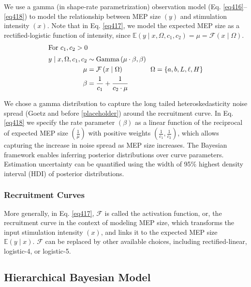 \documentclass[sn-mathphys-ay]{sn-jnl}%
\theoremstyle{thmstyleone}%
\theoremstyle{thmstyletwo}%
\theoremstyle{thmstylethree}%
\begin{document}
We use a gamma (in shape-rate parametrization) observation model (Eq. \ref{eq416}--\ref{eq418}) to model the relationship between MEP size $\left(y\right)$ and stimulation intensity $\left(x\right)$. Note that in Eq. \ref{eq417}, we model the expected MEP size as a rectified-logistic function of intensity, since $\mathbb{E}\left(y \mid x, \Omega, c_1, c_2\right) = \mu = \mathcal{F}\left(x\mid\Omega\right)$.
\begin{align}
    \intertext{For $c_1, c_2 > 0$}
    y \mid x, \Omega, c_1, c_2 &\sim \text{Gamma}\left(\mu\cdot\beta, \beta\right) \label{eq416}\\
    \mu & = \mathcal{F}\left(x \mid \Omega\right) \label{eq417} \hspace{40pt}{\Omega} = \left\{a, b, L, \ell, H\right\}\\
    \beta &= \frac{1}{c_1} + \frac{1}{c_2\cdot\mu} \label{eq418}
\end{align}

We chose a gamma distribution to capture the long tailed heteroskedasticity noise spread (Goetz and before \ref{placeholder}) around the recruitment curve. In Eq. \ref{eq418} we specify the rate parameter $\left(\beta\right)$ as a linear function of the reciprocal of expected MEP size $\left(\frac1\mu\right)$ with positive weights $\left(\frac1{c_1}, \frac1{c_2}\right)$, which allows capturing the increase in noise spread as MEP size increases. The Bayesian framework enables inferring posterior distributions over curve parameters. Estimation uncertainty can be quantified using the width of 95\% highest density interval (HDI) of posterior distributions.

\subsubsection{Recruitment Curves}
More generally, in Eq. \ref{eq417}, $\mathcal{F}$ is called the activation function, or, the recruitment curve in the context of modeling MEP size, which transforms the input stimulation intensity $\left(x\right)$, and links it to the expected MEP size $\mathbb{E}\left(y\mid x\right)$. $\mathcal{F}$ can be replaced by other available choices, including rectified-linear, logistic-4, or logistic-5.

\subsection{Hierarchical Bayesian Model}
\end{document}
